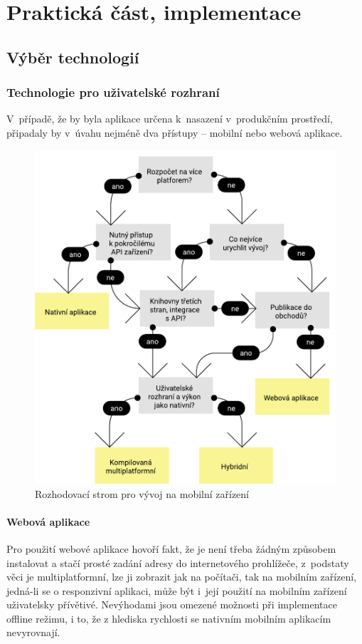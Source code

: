 \documentclass[a4paper,11pt,openany,twoside]{book}
\begin{document}
\part{Praktická část, implementace}

\chapter{Výběr technologií}

\section{Technologie pro uživatelské rozhraní}

V~případě, že by byla aplikace určena k~nasazení v~produkčním prostředí, připadaly by v~úvahu nejméně dva přístupy -- mobilní nebo webová aplikace.

\begin{figure}[h!]
	\centering
	\includegraphics[scale=0.7]{img/app-decision-tree.pdf}
	\caption{Rozhodovací strom pro vývoj na mobilní zařízení}
	\label{appdecisiontree}
\end{figure}

\subsection{Webová aplikace}
Pro použití webové aplikace hovoří fakt, že je není třeba žádným způsobem instalovat a stačí prosté zadání adresy do internetového prohlížeče, z~podstaty věci je multiplatformní, lze ji zobrazit jak na počítači, tak na mobilním zařízení, jedná-li se o responzivní aplikaci, může být i~její použití na mobilním zařízení uživatelsky přívětivé. Nevýhodami jsou omezené možnosti při implementace offline režimu, i to, že z hlediska rychlosti se nativním mobilním aplikacím nevyrovnají. \cite{stevens2018what}
\end{document}
